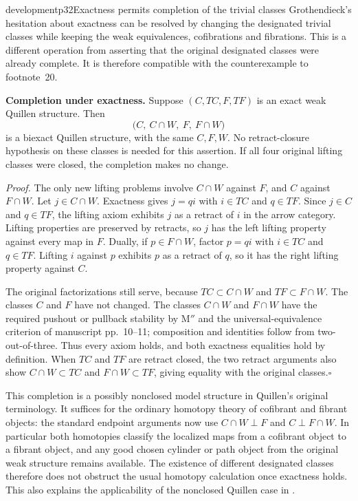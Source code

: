 \begin{dcomment}{development}{p32}{Exactness permits completion of the trivial classes}
Grothendieck's hesitation about exactness can be resolved by changing the designated trivial classes while keeping the weak equivalences, cofibrations and fibrations. This is a different operation from asserting that the original designated classes were already complete. It is therefore compatible with the counterexample to footnote~20.

\noindent\textbf{Completion under exactness.}\ours\quad
Suppose $(C,TC,F,TF)$ is an exact weak Quillen structure. Then
\[
 \bigl(C,\ C\cap W,\ F,\ F\cap W\bigr)
\]
is a biexact Quillen structure, with the same $C,F,W$. No retract-closure hypothesis on these classes is needed for this assertion. If all four original lifting classes were closed, the completion makes no change.

\emph{Proof.} The only new lifting problems involve $C\cap W$ against $F$, and $C$ against $F\cap W$. Let $j\in C\cap W$. Exactness gives $j=qi$ with $i\in TC$ and $q\in TF$. Since $j\in C$ and $q\in TF$, the lifting axiom exhibits $j$ as a retract of $i$ in the arrow category. Lifting properties are preserved by retracts, so $j$ has the left lifting property against every map in $F$. Dually, if $p\in F\cap W$, factor $p=qi$ with $i\in TC$ and $q\in TF$. Lifting $i$ against $p$ exhibits $p$ as a retract of $q$, so it has the right lifting property against $C$.

The original factorizations still serve, because $TC\subset C\cap W$ and $TF\subset F\cap W$. The classes $C$ and $F$ have not changed. The classes $C\cap W$ and $F\cap W$ have the required pushout or pullback stability by $\text{M}''$ and the universal-equivalence criterion of manuscript pp.~10--11; composition and identities follow from two-out-of-three. Thus every axiom holds, and both exactness equalities hold by definition. When $TC$ and $TF$ are retract closed, the two retract arguments also show $C\cap W\subset TC$ and $F\cap W\subset TF$, giving equality with the original classes.\hfill$\square$

This completion is a possibly nonclosed model structure in Quillen's original terminology. It suffices for the ordinary homotopy theory of cofibrant and fibrant objects: the standard endpoint arguments now use $C\cap W\perp F$ and $C\perp F\cap W$. In particular both homotopies classify the localized maps from a cofibrant object to a fibrant object, and any good chosen cylinder or path object from the original weak structure remains available. The existence of different designated classes therefore does not obstruct the usual homotopy calculation once exactness holds. This also explains the applicability of the nonclosed Quillen case in \citet[Example~5.2]{Cisinski2010}.


\end{dcomment}
